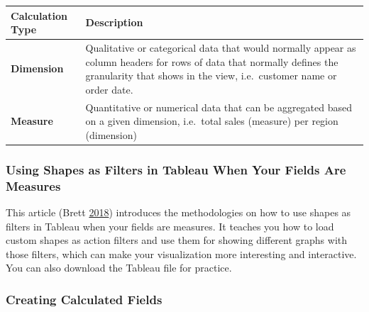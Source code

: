 \documentclass[]{book}
\begin{document}
\begin{longtable}[]{@{}ll@{}}
\toprule
\begin{minipage}[b]{0.15\columnwidth}\raggedright
\textbf{Calculation Type}\strut
\end{minipage} & \begin{minipage}[b]{0.80\columnwidth}\raggedright
\textbf{Description}\strut
\end{minipage}\tabularnewline
\midrule
\endhead
\begin{minipage}[t]{0.15\columnwidth}\raggedright
\textbf{Dimension}\strut
\end{minipage} & \begin{minipage}[t]{0.80\columnwidth}\raggedright
Qualitative or categorical data that would normally appear as column headers for rows of data that normally defines the granularity that shows in the view, i.e.~customer name or order date.\strut
\end{minipage}\tabularnewline
\begin{minipage}[t]{0.15\columnwidth}\raggedright
\textbf{Measure}\strut
\end{minipage} & \begin{minipage}[t]{0.80\columnwidth}\raggedright
Quantitative or numerical data that can be aggregated based on a given dimension, i.e.~total sales (measure) per region (dimension)\strut
\end{minipage}\tabularnewline
\bottomrule
\end{longtable}

\hypertarget{using-shapes-as-filters-in-tableau-when-your-fields-are-measures}{%
\subsubsection{Using Shapes as Filters in Tableau When Your Fields Are Measures}\label{using-shapes-as-filters-in-tableau-when-your-fields-are-measures}}

This article (Brett \protect\hyperlink{ref-measures}{2018}) introduces the methodologies on how to use shapes as filters in Tableau when your fields are measures. It teaches you how to load custom shapes as action filters and use them for showing different graphs with those filters, which can make your visualization more interesting and interactive. You can also download the Tableau file for practice.

\hypertarget{creating-calculated-fields}{%
\subsubsection{Creating Calculated Fields}\label{creating-calculated-fields}}
\end{document}
